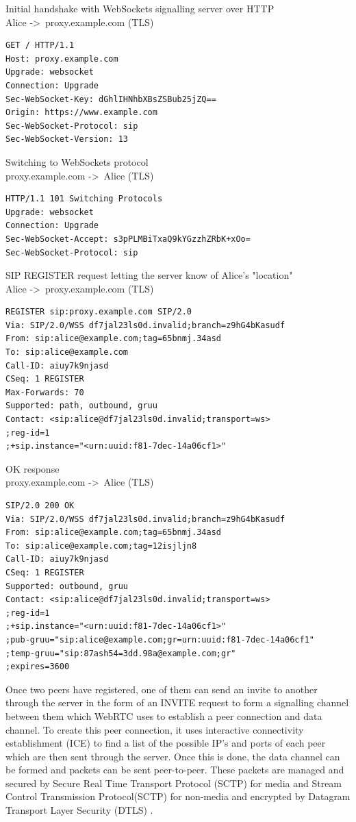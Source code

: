 \documentclass[]{report}
\begin{document}
Initial handshake with WebSockets signalling server over HTTP \\
Alice -\textgreater\ proxy.example.com (TLS)
\begin{lstlisting}[tabsize=1,frame=single, basicstyle=\ttfamily\footnotesize]
GET / HTTP/1.1
Host: proxy.example.com
Upgrade: websocket
Connection: Upgrade
Sec-WebSocket-Key: dGhlIHNhbXBsZSBub25jZQ==
Origin: https://www.example.com
Sec-WebSocket-Protocol: sip
Sec-WebSocket-Version: 13
\end{lstlisting}
Switching to WebSockets protocol \\
proxy.example.com -\textgreater\ Alice (TLS)
\begin{lstlisting}[tabsize=1,frame=single, basicstyle=\ttfamily\footnotesize]
HTTP/1.1 101 Switching Protocols
Upgrade: websocket
Connection: Upgrade
Sec-WebSocket-Accept: s3pPLMBiTxaQ9kYGzzhZRbK+xOo=
Sec-WebSocket-Protocol: sip
\end{lstlisting}
SIP REGISTER request letting the server know of Alice's "location" \\
Alice -\textgreater\ proxy.example.com (TLS)
\begin{lstlisting}[tabsize=1,frame=single, basicstyle=\ttfamily\footnotesize]
REGISTER sip:proxy.example.com SIP/2.0
Via: SIP/2.0/WSS df7jal23ls0d.invalid;branch=z9hG4bKasudf
From: sip:alice@example.com;tag=65bnmj.34asd
To: sip:alice@example.com
Call-ID: aiuy7k9njasd
CSeq: 1 REGISTER
Max-Forwards: 70
Supported: path, outbound, gruu
Contact: <sip:alice@df7jal23ls0d.invalid;transport=ws>
;reg-id=1
;+sip.instance="<urn:uuid:f81-7dec-14a06cf1>"
\end{lstlisting}
OK response \\
proxy.example.com -\textgreater\ Alice (TLS)
\begin{lstlisting}[tabsize=1,frame=single, basicstyle=\ttfamily\footnotesize]
SIP/2.0 200 OK
Via: SIP/2.0/WSS df7jal23ls0d.invalid;branch=z9hG4bKasudf
From: sip:alice@example.com;tag=65bnmj.34asd
To: sip:alice@example.com;tag=12isjljn8
Call-ID: aiuy7k9njasd
CSeq: 1 REGISTER
Supported: outbound, gruu
Contact: <sip:alice@df7jal23ls0d.invalid;transport=ws>
;reg-id=1
;+sip.instance="<urn:uuid:f81-7dec-14a06cf1>"
;pub-gruu="sip:alice@example.com;gr=urn:uuid:f81-7dec-14a06cf1"
;temp-gruu="sip:87ash54=3dd.98a@example.com;gr"
;expires=3600
\end{lstlisting}

	Once two peers have registered, one of them can send an invite to another through the server in the form of an INVITE request to form a signalling channel between them which WebRTC uses to establish a peer connection and data channel. To create this peer connection, it uses interactive connectivity establishment (ICE) to find a list of the possible IP's and ports of each peer which are then sent through the server. Once this is done, the data channel can be formed and packets can be sent peer-to-peer. These packets are managed and secured by Secure Real Time Transport Protocol (SCTP) for media and Stream Control Transmission Protocol(SCTP) for non-media and encrypted by Datagram Transport Layer Security (DTLS) \cite{WebRTC Data Channel Establishment Protocol}.
				
\end{document}
